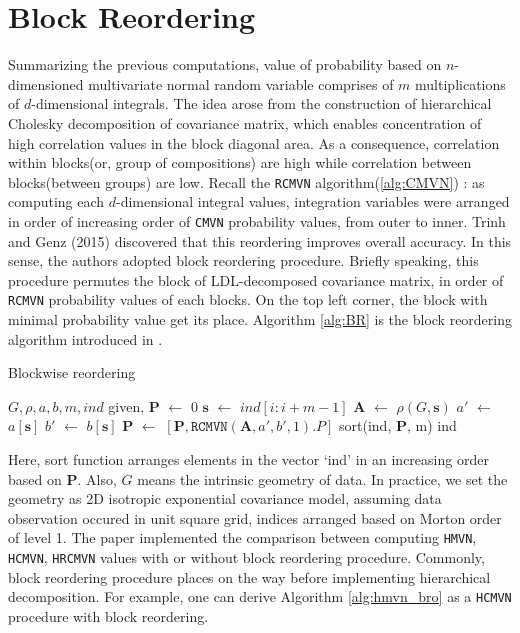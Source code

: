 \section{Block Reordering}

Summarizing the previous computations, value of probability based on $n$-dimensioned multivariate normal random variable comprises of $m$ multiplications of $d$-dimensional integrals. The idea arose from the construction of hierarchical Cholesky decomposition of covariance matrix, which enables concentration of high correlation values in the block diagonal area. As a consequence, correlation within blocks(or, group of compositions) are high while correlation between blocks(between groups) are low. Recall the \texttt{RCMVN} algorithm(\ref{alg:CMVN}) : as computing each $d$-dimensional integral values, integration variables were arranged in order of increasing order of \texttt{CMVN} probability values, from outer to inner. Trinh and Genz (2015) discovered that this reordering improves overall accuracy. In this sense, the authors adopted block reordering procedure. Briefly speaking, this procedure permutes the block of LDL-decomposed covariance matrix, in order of \texttt{RCMVN} probability values of each blocks. On the top left corner, the block with minimal probability value get its place. Algorithm \ref{alg:BR} is the block reordering algorithm introduced in \citet{cao2019hierarchical}.

\begin{algorithm}[ht]
    \caption{Blockwise reordering}
	\begin{algorithmic}[1]
            \State $G, \rho, a, b, m, ind$ given, $\mathbf{P}$ $\leftarrow$ $0$
                \State $\mathbf{s}$ $\leftarrow$ $ind[i:i+m-1]$
                \State $\mathbf{A}$ $\leftarrow$ $\rho(G, \mathbf{s})$
                \State $a'$ $\leftarrow$ $a[\mathbf{s}]$
                \State $b'$ $\leftarrow$ $b[\mathbf{s}]$
                \State $\mathbf{P}$ $\leftarrow$ $[\mathbf{P}, \texttt{RCMVN}(\mathbf{A},a',b',1).P]$
            \EndFor
            \State sort(ind, $\mathbf{P}$, m)
            \State \Return ind
        \EndProcedure
    \end{algorithmic}\label{alg:BR}
\end{algorithm}

Here, sort function arranges elements in the vector `ind' in an increasing order based on $\mathbf{P}$. Also, $G$ means the intrinsic geometry of data. In practice, we set the geometry as 2D isotropic exponential covariance model, assuming data observation occured in unit square grid, indices arranged based on Morton order of level 1. The paper implemented the comparison between computing \texttt{HMVN}, \texttt{HCMVN}, \texttt{HRCMVN} values with or without block reordering procedure. Commonly, block reordering procedure places on the way before implementing hierarchical decomposition. For example, one can derive Algorithm \ref{alg:hmvn_bro} as a \texttt{HCMVN} procedure with block reordering.

